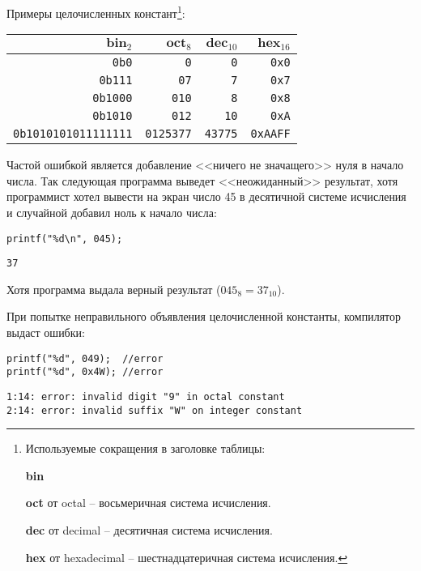 \documentclass[myc.tex]{subfiles}
\begin{document}
Примеры целочисленных констант\footnote{
Используемые сокращения в заголовке таблицы:

\textbf{bin} %

\textbf{oct} от octal -- восьмеричная система исчисления.

\textbf{dec} от decimal -- десятичная система исчисления.

\textbf{hex} от hexadecimal -- шестнадцатеричная система исчисления.
}:

\begin{small}
\begin{center}
\begin{tabular}{|r|r|r|r|}
\hline
$\textbf{bin}_{2}$ & $\textbf{oct}_{8}$ & $\textbf{dec}_{10}$ & $\textbf{hex}_{16}$\\
\hline
\texttt{0b0} & \texttt{0} & \texttt{0} & \texttt{0x0}\\
\texttt{0b111} & \texttt{07} & \texttt{7} & \texttt{0x7}\\
\texttt{0b1000} & \texttt{010} & \texttt{8} & \texttt{0x8}\\
\texttt{0b1010} & \texttt{012} & \texttt{10} & \texttt{0xA}\\
\texttt{0b1010101011111111} & \texttt{0125377} & \texttt{43775} & \texttt{0xAAFF}\\
\hline
\end{tabular}
\end{center}
\end{small}

Частой ошибкой является добавление <<ничего не значащего>> нуля в начало числа. Так следующая программа выведет <<неожиданный>> результат, хотя программист хотел вывести на экран число 45 в десятичной системе исчисления и случайной добавил ноль к начало числа:
\begin{lstlisting}
printf("%d\n", 045);
\end{lstlisting}
\begin{verbatim}
37
\end{verbatim} 

Хотя программа выдала верный результат ($045_{8} = 37_{10}$).

При попытке неправильного объявления целочисленной константы, компилятор выдаст ошибки:
\begin{lstlisting}
printf("%d", 049);  //error
printf("%d", 0x4W); //error
\end{lstlisting}
\begin{small}
\begin{verbatim}
1:14: error: invalid digit "9" in octal constant
2:14: error: invalid suffix "W" on integer constant
\end{verbatim} 
\end{small}
\end{document}
